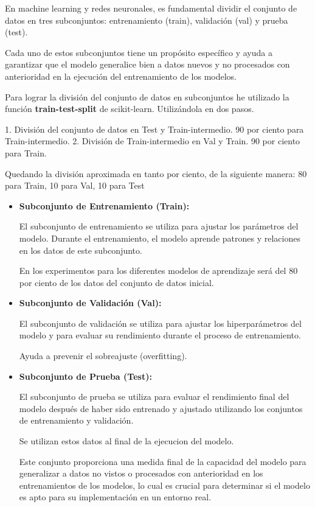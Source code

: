 En machine learning y redes neuronales, es fundamental dividir el conjunto de datos en tres subconjuntos: entrenamiento (train), validación (val) y prueba (test). 

Cada uno de estos subconjuntos tiene un propósito específico y ayuda a garantizar que el modelo generalice bien a datos nuevos y no procesados con anterioridad en la ejecución del entrenamiento de los modelos. 

Para lograr la división del conjunto de datos en subconjuntos he utilizado la función \textbf{train-test-split} de scikit-learn. Utilizándola en dos pasos.

1. División del conjunto de datos en Test y Train-intermedio. 90 por ciento para Train-intermedio.
2. División de Train-intermedio en Val y Train. 90 por ciento para Train.

Quedando la división aproximada en tanto por ciento, de la siguiente manera:
80 para Train, 10 para Val, 10 para Test





\begin{itemize}
	
\item
\textbf{Subconjunto de Entrenamiento (Train):}

	El subconjunto de entrenamiento se utiliza para ajustar los parámetros del modelo. Durante el entrenamiento, el modelo aprende patrones y relaciones en los datos de este subconjunto. 
	
	En los experimentos para los diferentes modelos de aprendizaje será del 80 por ciento de los datos del conjunto de datos inicial.

\item 
\textbf{Subconjunto de Validación (Val):}

	El subconjunto de validación se utiliza para ajustar los hiperparámetros del modelo y para evaluar su rendimiento durante el proceso de entrenamiento. 
	
	Ayuda a prevenir el sobreajuste (overfitting). 
	
\item 
\textbf{Subconjunto de Prueba (Test):}


	El subconjunto de prueba se utiliza para evaluar el rendimiento final del modelo después de haber sido entrenado y ajustado utilizando los conjuntos de entrenamiento y validación. 
	
	Se utilizan estos datos al final de la ejecucion del modelo.
	
	Este conjunto proporciona una medida final de la capacidad del modelo para generalizar a datos no vistos o procesados con anterioridad en los entrenamientos de los modelos, lo cual es crucial para determinar si el modelo es apto para su implementación en un entorno real.
	
\end{itemize}



